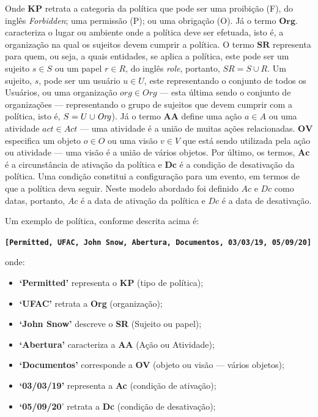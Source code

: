 Onde $ \textbf{KP} $ retrata a categoria da política que pode ser uma proibição (F), do inglês \textit{Forbidden}; uma permissão (P); ou uma obrigação (O). Já o termo $ \textbf{Org} $. caracteriza o lugar ou ambiente onde a política deve ser efetuada, isto é, a organização na qual os sujeitos devem cumprir a política. O termo $ \textbf{SR} $ representa para quem, ou seja, a quais entidades, se aplica a política, este pode ser um sujeito $ s \in S $ ou um papel $ r \in R $, do inglês \textit{role}, portanto, $ SR = S \cup R $. Um sujeito, $ s $, pode ser um usuário $ u \in U $, este representando o conjunto de todos os Usuários, ou uma organização $ org \in Org $ --- esta última sendo o conjunto de organizações --- representando o grupo de sujeitos que devem cumprir com a política, isto é, $ S = U \cup \textrm{\textit{Org}} $). Já o termo $ \textbf{AA} $ define uma ação $ a \in A  $ ou uma atividade $ act \in Act  $ --- uma atividade é a união de muitas ações relacionadas. $ \textbf{OV} $ especifica um objeto $ o \in O $ ou uma visão $ v \in V $ que está sendo utilizada pela ação ou atividade --- uma visão é a união de vários objetos. Por último, os termos, $ \textbf{Ac} $ é a circunstância de ativação da política e $ \textbf{Dc} $ é a condição de desativação da política. Uma condição constitui a configuração para um evento, em termos de que a política deva seguir. Neste modelo abordado foi definido $ Ac $ e $ Dc $ como datas, portanto, $ Ac $ é a data de ativação da política e $ Dc $ é a data de desativação.

Um exemplo de política, conforme descrita acima é:

\textbf{\texttt{[Permitted, UFAC, John Snow, Abertura, Documentos, 03/03/19, 05/09/20]}}

onde:
\begin{itemize}
	\item \textbf{`Permitted'} representa o \textbf{KP} (tipo de política); 
	\item \textbf{`UFAC'} retrata a \textbf{Org} (organização);
	\item \textbf{`John Snow'} descreve o \textbf{SR} (Sujeito ou papel);
	\item \textbf{`Abertura'} caracteriza a \textbf{AA} (Ação ou Atividade);
	\item \textbf{`Documentos'} corresponde a \textbf{OV} (objeto ou visão --- vários objetos);
	\item \textbf{`03/03/19'} representa a \textbf{Ac} (condição de ativação);
	\item \textbf{`05/09/20}' retrata a \textbf{Dc} (condição de desativação);
\end{itemize}

